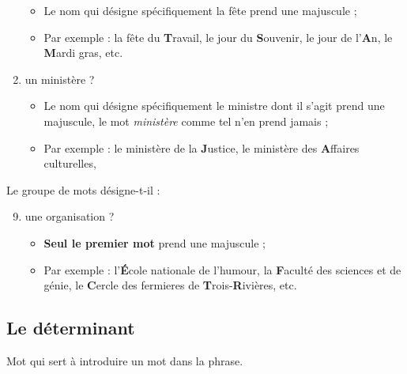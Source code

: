 \documentclass[10pt, french]{article}
\begin{document}
\begin{multicols*}{2}
\begin{enumerate}
		\begin{itemize}
		\item	Le nom qui désigne spécifiquement la fête prend une majuscule ;
		\item	Par exemple : la fête du \textbf{T}ravail, le jour du \textbf{S}ouvenir, le jour de l'\textbf{A}n, le \textbf{M}ardi gras, etc.
		\end{itemize}
	\item	un ministère ?
		\begin{itemize}
		\item	Le nom qui désigne spécifiquement le ministre dont il s'agit prend une majuscule, le mot \textit{ministère} comme tel n'en prend jamais ;
		\item	Par exemple : le ministère de la \textbf{J}ustice, le ministère des \textbf{A}ffaires culturelles, 
		\end{itemize}
\end{enumerate}

Le groupe de mots désigne-t-il :
\begin{enumerate}
	\setcounter{enumi}{8}
	\item	une organisation ?
		\begin{itemize}
		\item	\textbf{Seul le premier mot} prend une majuscule ;
		\item	Par exemple : l'\textbf{É}cole nationale de l'humour, la \textbf{F}aculté des sciences et de génie, le \textbf{C}ercle des fermieres de \textbf{T}rois-\textbf{R}ivières, etc.
		\end{itemize}
\end{enumerate}

\columnbreak
\subsection{Le déterminant}
\begin{definitionNOHFILL}[Le déterminant]
Mot qui sert à introduire un mot dans la phrase.
\end{definitionNOHFILL}


\end{multicols*}
\end{document}
